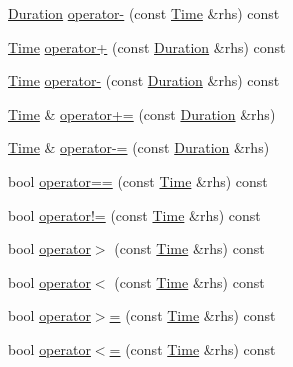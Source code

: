 \begin{DoxyCompactItemize}
\item 
\hyperlink{classapollo_1_1cyber_1_1Duration}{Duration} \hyperlink{classapollo_1_1cyber_1_1Time_a480811fc740b96921a000d72f4db6a4c}{operator-\/} (const \hyperlink{classapollo_1_1cyber_1_1Time}{Time} \&rhs) const 
\item 
\hyperlink{classapollo_1_1cyber_1_1Time}{Time} \hyperlink{classapollo_1_1cyber_1_1Time_a22555ef9af1ec08c0648dabb287fb01f}{operator+} (const \hyperlink{classapollo_1_1cyber_1_1Duration}{Duration} \&rhs) const 
\item 
\hyperlink{classapollo_1_1cyber_1_1Time}{Time} \hyperlink{classapollo_1_1cyber_1_1Time_ab0a545c33cc473b3adda36abd0dc172c}{operator-\/} (const \hyperlink{classapollo_1_1cyber_1_1Duration}{Duration} \&rhs) const 
\item 
\hyperlink{classapollo_1_1cyber_1_1Time}{Time} \& \hyperlink{classapollo_1_1cyber_1_1Time_a7e6e1d4f6ce7e01e642180fd6d77f45c}{operator+=} (const \hyperlink{classapollo_1_1cyber_1_1Duration}{Duration} \&rhs)
\item 
\hyperlink{classapollo_1_1cyber_1_1Time}{Time} \& \hyperlink{classapollo_1_1cyber_1_1Time_a4d2e61854c811fd25e02f534f33bc074}{operator-\/=} (const \hyperlink{classapollo_1_1cyber_1_1Duration}{Duration} \&rhs)
\item 
bool \hyperlink{classapollo_1_1cyber_1_1Time_aa8c81d9ddc8c9d6849e67eb4cd3c983d}{operator==} (const \hyperlink{classapollo_1_1cyber_1_1Time}{Time} \&rhs) const 
\item 
bool \hyperlink{classapollo_1_1cyber_1_1Time_abc05681535bb59a94c967adc8884cada}{operator!=} (const \hyperlink{classapollo_1_1cyber_1_1Time}{Time} \&rhs) const 
\item 
bool \hyperlink{classapollo_1_1cyber_1_1Time_af856ddacb838250fd39db83092363ad7}{operator$>$} (const \hyperlink{classapollo_1_1cyber_1_1Time}{Time} \&rhs) const 
\item 
bool \hyperlink{classapollo_1_1cyber_1_1Time_a4540a3cb50ced69ebd2e717fcf2b6cdf}{operator$<$} (const \hyperlink{classapollo_1_1cyber_1_1Time}{Time} \&rhs) const 
\item 
bool \hyperlink{classapollo_1_1cyber_1_1Time_a296259bd901f0180f8a852db862f4953}{operator$>$=} (const \hyperlink{classapollo_1_1cyber_1_1Time}{Time} \&rhs) const 
\item 
bool \hyperlink{classapollo_1_1cyber_1_1Time_a74b495d0064e800de067aabb0349d043}{operator$<$=} (const \hyperlink{classapollo_1_1cyber_1_1Time}{Time} \&rhs) const 
\end{DoxyCompactItemize}
